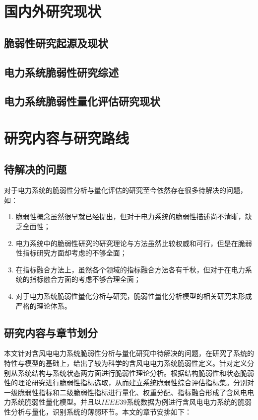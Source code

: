 \section{国内外研究现状}
\label{sec:research_presentSituation}

\subsection{脆弱性研究起源及现状}
\label{sec:origin}


\subsection{电力系统脆弱性研究综述}
\label{sec:presentPowerSys}


\subsection{电力系统脆弱性量化评估研究现状}
\label{sec:presentSituation3}

\section{研究内容与研究路线}
\label{sec:research_curise}

\subsection{待解决的问题}
\label{sec:research_problem}
对于电力系统的脆弱性分析与量化评估的研究至今依然存在很多待解决的问题，如：
\begin{enumerate}[(1)]
  \item 脆弱性概念虽然很早就已经提出，但对于电力系统的脆弱性描述尚不清晰，缺乏全面性；
  \item 电力系统中的脆弱性研究的研究理论与方法虽然比较权威和可行，但是在脆弱性指标研究方面却考虑的不够全面；
  \item 在指标融合方法上，虽然各个领域的指标融合方法各有千秋，但对于在电力系统的指标融合方面的考虑不够合理全面；
  \item 对于电力系统脆弱性量化分析与研究，脆弱性量化分析模型的相关研究未形成严格的理论体系。
 \end{enumerate}

\subsection{研究内容与章节划分}
\label{sec:contendAndIdea}
本文针对含风电电力系统脆弱性分析与量化研究中待解决的问题，在研究了系统的特性与模型的基础上，给出了较为科学的含风电电力系统脆弱性定义。针对定义分别从系统结构与系统状态两方面进行脆弱性理论分析。根据结构脆弱性和状态脆弱性的理论研究进行脆弱性指标选取，从而建立系统脆弱性综合评估指标集。分别对一级脆弱性指标和二级脆弱性指标进行量化、权重分配、指标融合形成了含风电电力系统脆弱性量化模型。并且以$IEEE39$系统数据为例进行含风电电力系统的脆弱性分析与量化，识别系统的薄弱环节。本文的章节安排如下：

